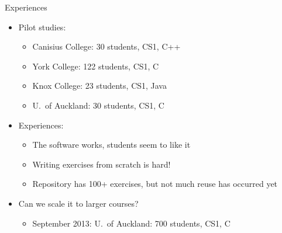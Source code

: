 \documentclass{beamer}
\begin{document}
\begin{frame}{Experiences}

\begin{itemize}
\item Pilot studies:
  \begin{itemize}
  \item Canisius College: 30 students, CS1, C++
  \item York College: 122 students, CS1, C
  \item Knox College: 23 students, CS1, Java
  \item U.\ of Auckland: 30 students, CS1, C
  \end{itemize}
\item Experiences:
  \begin{itemize}
  \item The software works, students seem to like it
  \item Writing exercises from scratch is hard!
  \item Repository has 100+ exercises, but not much reuse has occurred yet
  \end{itemize}
\item Can we scale it to larger courses?
  \begin{itemize}
\item September 2013: U.\ of Auckland: 700 students, CS1, C
  \end{itemize}
\end{itemize}

\end{frame}

\end{document}
